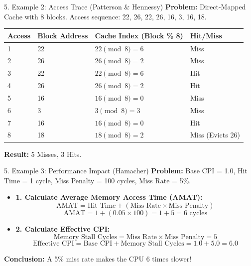 \documentclass[aspectratio=169]{beamer}
\begin{document}
\begin{frame}{5. Example 2: Access Trace (Patterson \& Hennessy)}
\textbf{Problem:} Direct-Mapped Cache with 8 blocks. Access sequence: 22, 26, 22, 26, 16, 3, 16, 18. 

\begin{table}[]
\begin{tabular}{|l|l|l|l|}
\hline
\textbf{Access} & \textbf{Block Address} & \textbf{Cache Index (Block \% 8)} & \textbf{Hit/Miss} \\ \hline
1               & 22                     & $22 \pmod 8 = 6$                    & Miss              \\ \hline
2               & 26                     & $26 \pmod 8 = 2$                    & Miss              \\ \hline
3               & 22                     & $22 \pmod 8 = 6$                    & Hit               \\ \hline
4               & 26                     & $26 \pmod 8 = 2$                    & Hit               \\ \hline
5               & 16                     & $16 \pmod 8 = 0$                    & Miss              \\ \hline
6               & 3                      & $3 \pmod 8 = 3$                     & Miss              \\ \hline
7               & 16                     & $16 \pmod 8 = 0$                    & Hit               \\ \hline
8               & 18                     & $18 \pmod 8 = 2$                    & Miss (Evicts 26)  \\ \hline
\end{tabular}
\end{table}
\textbf{Result:} 5 Misses, 3 Hits.
\end{frame}

\begin{frame}{5. Example 3: Performance Impact (Hamacher)}
\textbf{Problem:} Base CPI = 1.0, Hit Time = 1 cycle, Miss Penalty = 100 cycles, Miss Rate = 5\%.
\begin{itemize}
    \item \textbf{1. Calculate Average Memory Access Time (AMAT):}
    \[ \text{AMAT} = \text{Hit Time} + (\text{Miss Rate} \times \text{Miss Penalty}) \]
    \[ \text{AMAT} = 1 + (0.05 \times 100) = 1 + 5 = 6 \text{ cycles} \]
    \item \textbf{2. Calculate Effective CPI:}
    \[ \text{Memory Stall Cycles} = \text{Miss Rate} \times \text{Miss Penalty} = 5 \]
    \[ \text{Effective CPI} = \text{Base CPI} + \text{Memory Stall Cycles} = 1.0 + 5.0 = 6.0 \]
\end{itemize}
\textbf{Conclusion:} A 5\% miss rate makes the CPU 6 times slower!
\end{frame}
\end{document}
